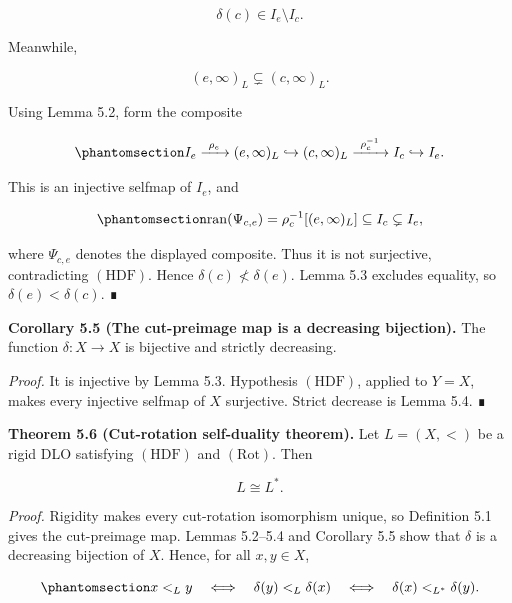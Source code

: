 \documentclass[
  english,
  11pt,
  reqno]{amsart}
\begin{document}
\[
\delta(c)\in I_e\setminus I_c.
\]

Meanwhile,

\[
(e,\infty)_L
\subsetneq
(c,\infty)_L.
\]

Using Lemma 5.2, form the composite

\begin{equation}\protect\phantomsection\label{eq:proper-ray-selfmap}{
I_e
\xrightarrow{\ \rho_e\ }
(e,\infty)_L
\hookrightarrow
(c,\infty)_L
\xrightarrow{\ \rho_c^{-1}\ }
I_c
\hookrightarrow
I_e.
}\end{equation}

This is an injective selfmap of \(I_e\), and

\begin{equation}\protect\phantomsection\label{eq:proper-ray-selfmap-range}{
\operatorname{ran}(\Psi_{c,e})
=
\rho_c^{-1}[(e,\infty)_L]
\subseteq
I_c
\subsetneq
I_e,
}\end{equation}

where \(\Psi_{c,e}\) denotes the displayed composite. Thus it is not
surjective, contradicting \((\mathrm{HDF})\). Hence
\(\delta(c)\not<\delta(e)\). Lemma 5.3 excludes equality, so
\(\delta(e)<\delta(c)\). ∎

\protect{}\label{cor:5-5-delta-bijective}

\textbf{Corollary 5.5 (The cut-preimage map is a decreasing bijection).}
The function \(\delta:X\to X\) is bijective and strictly decreasing.

\emph{Proof.} It is injective by Lemma 5.3. Hypothesis
\((\mathrm{HDF})\), applied to \(Y=X\), makes every injective selfmap of
\(X\) surjective. Strict decrease is Lemma 5.4. ∎

\protect{}\label{thm:5-6-cut-rotation-selfduality}

\textbf{Theorem 5.6 (Cut-rotation self-duality theorem).} Let
\(L=(X,<)\) be a rigid DLO satisfying \((\mathrm{HDF})\) and
\((\mathrm{Rot})\). Then

\[
L\cong L^*.
\]

\emph{Proof.} Rigidity makes every cut-rotation isomorphism unique, so
Definition 5.1 gives the cut-preimage map. Lemmas 5.2--5.4 and Corollary
5.5 show that \(\delta\) is a decreasing bijection of \(X\). Hence, for
all \(x,y\in X\),

\begin{equation}\protect\phantomsection\label{eq:delta-anti-isomorphism}{
x<_L y
\quad\Longleftrightarrow\quad
\delta(y)<_L\delta(x)
\quad\Longleftrightarrow\quad
\delta(x)<_{L^*}\delta(y).
}\end{equation}
\end{document}
